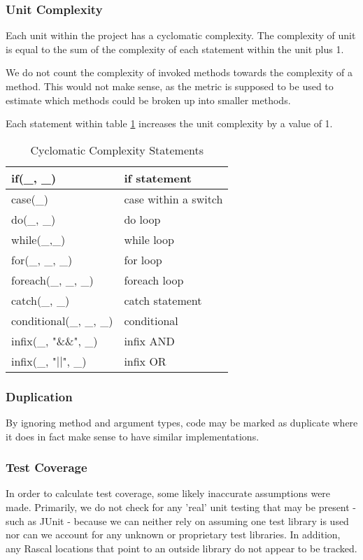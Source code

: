 \documentclass{article}
\begin{document}
\subsubsection{Unit Complexity}
Each unit within the project has a cyclomatic complexity. The complexity of unit is equal to the  sum of the complexity of each statement within the unit plus 1.

We do not count the complexity of invoked methods towards the complexity of a method. This would not make sense, as the metric is supposed to be used to estimate which methods could be broken up into smaller methods.

Each statement within table \ref{complexityvalues} increases the unit complexity by a value of 1.

\begin{table}[h!tbp]
	\caption{Cyclomatic Complexity Statements}
	\label{complexityvalues}
	\begin{tabular}{l|l}	
		\hline
		if(\_, \_)					&			if statement \\
		\hline
		case(\_)					&			case within a switch \\
		\hline
		do(\_, \_)					&			do loop \\
		\hline
		while(\_,\_)				&			while loop \\
		\hline
		for(\_, \_, \_)				&			for loop \\
		\hline
		foreach(\_, \_, \_)			&			foreach loop \\
		\hline
		catch(\_, \_)				&			catch statement \\
		\hline
		conditional(\_, \_, \_)		&			conditional \\
		\hline
		infix(\_, "\&\&", \_)		&			infix AND \\
		\hline
		infix(\_, "\(||\)", \_)		&			infix OR \\
		\hline
	\end{tabular}
\end{table}

\subsubsection{Duplication}
By ignoring method and argument types, code may be marked as duplicate where it does in fact make sense to have similar implementations.



\subsubsection{Test Coverage} \label{assumetests}
In order to calculate test coverage, some likely inaccurate assumptions were made.
Primarily, we do not check for any 'real' unit testing that may be present - such as JUnit - because we can neither rely on assuming one test library is used nor can we account for any unknown or proprietary test libraries. In addition, any Rascal locations that point to an outside library do not appear to be tracked.
\end{document}
